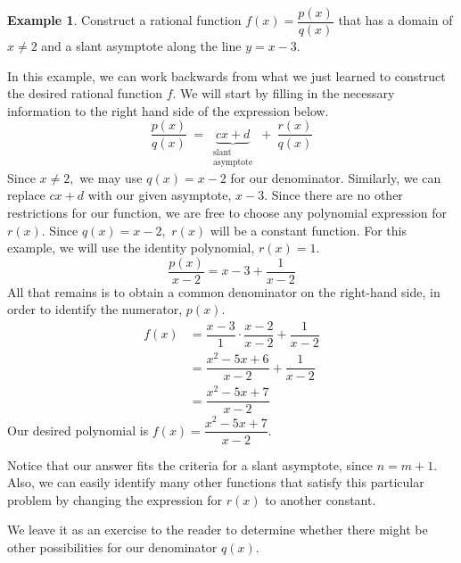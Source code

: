 \documentclass[12pt]{book}
\theoremstyle{definition}
\newtheorem{example}{Example}
\begin{document}
\newpage
\begin{example} Construct a rational function $f(x)=\dfrac{p(x)}{q(x)}$ that has a domain of $x\neq 2$ and a slant asymptote along the line $y=x-3$.
\par
In this example, we can work backwards from what we just learned to construct the desired rational function $f$.  We will start by filling in the necessary information to the right hand side of the expression below.
$$\dfrac{p(x)}{q(x)}\ =\ \underbrace{cx+d}_{\substack{\text{slant} \\ \text{asymptote}}} \ + \ \dfrac{r(x)}{q(x)}$$
Since $x\neq 2,$ we may use $q(x)=x-2$ for our denominator.  Similarly, we can replace $cx+d$ with our given asymptote, $x-3$.  Since there are no other restrictions for our function, we are free to choose any polynomial expression for $r(x)$.  Since $q(x)=x-2,$ $r(x)$ will be a constant function.  For this example, we will use the identity polynomial, $r(x)=1$.
$$\dfrac{p(x)}{x-2}=x-3+\dfrac{1}{x-2}$$
All that remains is to obtain a common denominator on the right-hand side, in order to identify the numerator, $p(x)$.
\begin{equation*}
\begin{split}
f(x) & = \dfrac{x-3}{1}\cdot\dfrac{x-2}{x-2}+\dfrac{1}{x-2} \\
 & = \dfrac{x^2-5x+6}{x-2}+\dfrac{1}{x-2}\\
 & = \dfrac{x^2-5x+7}{x-2}
\end{split}
\end{equation*}
Our desired polynomial is $f(x)=\dfrac{x^2-5x+7}{x-2}$.
\par
Notice that our answer fits the criteria for a slant asymptote, since $n=m+1$.  Also, we can easily identify many other functions that satisfy this particular problem by changing the expression for $r(x)$ to another constant.
\par
We leave it as an exercise to the reader to determine whether there might be other possibilities for our denominator $q(x).$
\end{example}
\newpage
\end{document}
